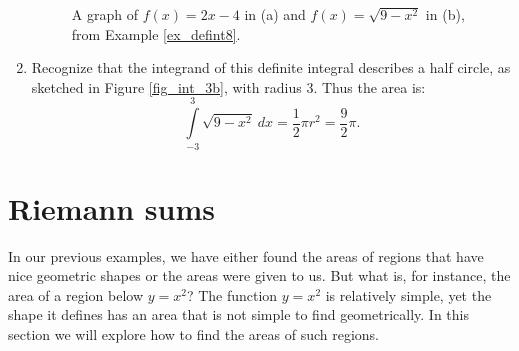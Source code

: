 \begin{example}
\begin{enumerate}
\begin{figure}[H]
\centering
\qquad
{}
\caption{A graph of $f(x) = 2x-4$ in (a) and $f(x) = \sqrt{9-x^2}$ in (b), from Example \ref{ex_defint8}.}
\end{figure}

		\item		Recognize that the integrand of this definite integral describes a half circle, as sketched in Figure \ref{fig_int_3b}, with radius 3. Thus the area is:
		$$\int\limits_{-3}^3 \sqrt{9-x^2}\ dx = \frac12\pi r^2 = \frac 92\pi.$$




\end{enumerate}
\end{example}



\section{Riemann sums}\label{sec:riemann}

In our previous examples, we have either found the areas of regions that have nice geometric shapes  or the areas were given to us. But what is, for instance, the area of a region below $y=x^2$? The function $y=x^2$ is relatively simple, yet the shape it defines has an area that is not simple to find geometrically. In this section we will explore how to find the areas of such regions.


